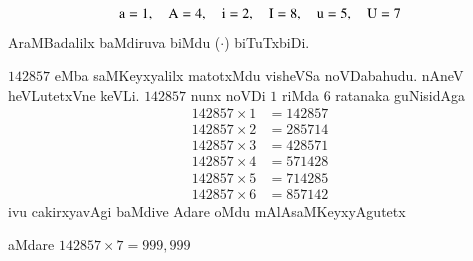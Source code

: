 \vskip -1cm

$$
{\text a} = 1, \quad {\text A} = 4, \quad {\text i} = 2, \quad {\text I} = 8, \quad {\text u} = 5, \quad {\text U} = 7
$$
AraMBadalilx baMdiruva biMdu ($\cdot$) biTuTxbiDi.



$142857$ eMba saMKeyxyalilx matotxMdu visheVSa noVDabahudu. nAneV heVLutetxVne keVLi. $142857$ nunx noVDi $1$ riMda $6$ ratanaka guNisidAga 
\begin{align*}
  142857 \times 1 & = 142857\\
  142857 \times 2 & = 285714\\
  142857 \times 3 & = 428571\\
  142857 \times 4 & =571428\\
  142857 \times 5 & =714285\\
  142857 \times 6 & =857142
\end{align*}
ivu cakirxyavAgi baMdive Adare oMdu mAlAsaMKeyxyAgutetx

 aMdare $142857 \times 7 = 999,999$

